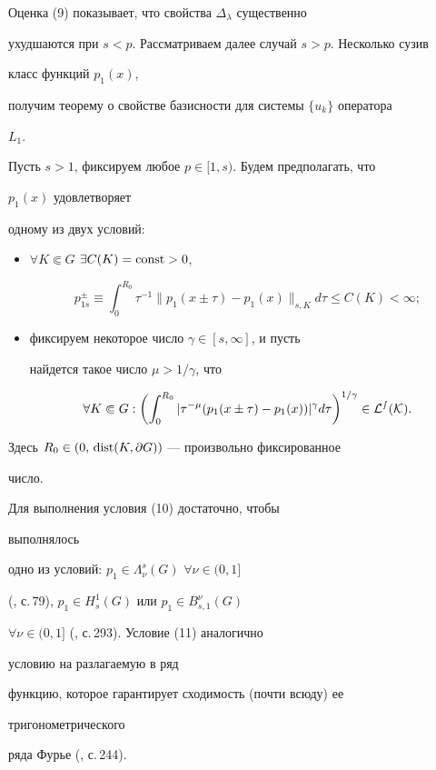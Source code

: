 Оценка (9) показывает, что свойства $\Delta_\lambda$ существенно


ухудшаются при $s<p$. Рассматриваем далее случай $s>p$. Несколько сузив


класс функций $p_1(x)$,


получим теорему о свойстве базисности для системы $\{u_k\}$ оператора


$L_1$.





Пусть $s>1$, фиксируем любое $p\in[1,s)$. Будем предполагать, что


$p_1(x)$ удовлетворяет


одному из двух условий:


\begin{itemize}


\item[1)] $\forall K\Subset G$ $\exists C(K)=\operatorname{const}>0$,


\begin{equation}


p^\pm_{1s}\equiv\int^{R_0}_0\tau^{-1}\|p_1(x\pm\tau)-


p_1(x)\|_{s,K}d\tau\le C(K)<\infty;


\end{equation}


\item[2)] фиксируем некоторое число $\gamma\in[s,\infty]$, и пусть


найдется такое число $\mu>1/\gamma$, что


\begin{equation}


\forall K\Subset G:\biggl(\int^{R_0}_0|\tau^{-\mu}


(p_1(x\pm\tau)-p_1(x))|^\gamma d\tau\biggr)^{1/\gamma}


\in\cal L^s(K).


\end{equation}


\end{itemize}


Здесь $R_0\in(0,\,\operatorname{dist}(K,\partial G))$ --- произвольно фиксированное


число.





\begin{note} Для выполнения условия (10) достаточно, чтобы


выполнялось


одно из условий: $p_1\in\Lambda^s_\nu(G)$ $\forall\nu\in(0,1]$


(\cite{6}, с.\,79), $p_1\in H^1_s(G)$ или $p_1\in B^\nu_{s,1}(G)$


$\forall\nu\in(0,1]$ (\cite{8}, с.\,293). Условие (11) аналогично


условию на разлагаемую в ряд


функцию, которое гарантирует сходимость (почти всюду) ее


тригонометрического


ряда Фурье (\cite{7}, с.\,244).


\end{note}





